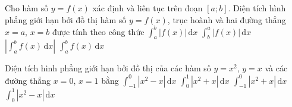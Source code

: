 \begin{ex}%
	Cho hàm số $y=f(x)$ xác  định và liên tục trên đoạn $[a;b]$. Diện tích hình phẳng giới hạn bởi đồ thị hàm số $y=f(x)$, trục hoành và hai đường thẳng $x=a$, $x=b$ được tính theo công thức
	 \choice
		{\True $\displaystyle\int_a^b  |f(x)|\mathrm{\,d}x$}
		{$\displaystyle\int_b^a |f(x)|\mathrm{\,d}x$} 
		{$\left|\displaystyle\int_a^b  f(x)\mathrm{\,d}x\right|$}
		{$\displaystyle\int_a^b f(x)\mathrm{\,d}x$} 
\end{ex}

\begin{ex}%
	Diện tích hình phẳng giới hạn bởi đồ thị của các hàm  số $y=x^2$, $y=x$ và các đường thẳng $x=0$, $x=1$ bằng
	 \choice
		{$\displaystyle\int_{-1}^0\left|x^2-x\right|\mathrm{\,d}x$} 
		 {$\displaystyle\int_0^1\left|x^2+x\right|\mathrm{\,d}x$}
		 {$\displaystyle\int_{-1}^0\left|x^2+x\right|\mathrm{\,d}x$}
		{\True $\displaystyle\int_0^1\left|x^2-x\right|\mathrm{\,d}x$} 
\end{ex}

